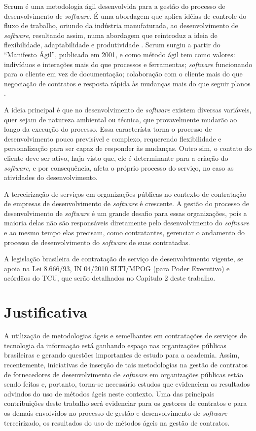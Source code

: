 Scrum é uma metodologia ágil desenvolvida para a gestão do processo de desenvolvimento de \textit{software}. É uma abordagem que aplica idéias de controle do fluxo de trabalho, oriundo da indústria manufaturada, ao desenvolvimento de \textit{software}, resultando assim, numa abordagem que reintroduz a ideia de flexibilidade, adaptabilidade e produtividade \cite{porto}. Scrum surgiu a partir do “Manifesto Ágil”, publicado em 2001, e como método ágil tem como valores: indivíduos e interações mais do que processos e ferramentas; \textit{software} funcionando para o cliente em vez de documentação; colaboração com o cliente mais do que negociação de contratos e resposta rápida às mudanças mais do que seguir planos \cite{manifesto}. 

A ideia principal é que no desenvolvimento de \textit{software} existem diversas variáveis, quer sejam de natureza ambiental ou técnica, que provavelmente mudarão ao longo da execução do processo. Essa característa torna o processo de desenvolvimento pouco previsível e complexo, requerendo flexibilidade e personalização para ser capaz de responder às mudanças. Outro sim, o contato do cliente deve ser ativo, haja visto que, ele é determinante para a criação do \textit{software}, e por consequência, afeta o próprio processo do serviço, no caso as atividades do desenvolvimento.

A terceirização de serviços em organizações públicas no contexto de contratação de empresas de desenvolvimento de \textit{software} é crescente. A gestão do processo de desenvolvimento de \textit{software} é um grande desafio para essas organizações, pois a maioria delas não são responsáveis diretamente pelo desenvolvimento do \textit{software} e ao mesmo tempo elas precisam, como contratantes, gerenciar o andamento do processo de desenvolvimento do \textit{software} de suas contratadas. 

A legislação brasileira de contratação de serviço de desenvolvimento vigente, se apoia na Lei 8.666/93, IN 04/2010 SLTI/MPOG (para Poder Executivo) e acórdãos do TCU, que serão detalhados no Capítulo 2 deste trabalho. 



\section[Justificativa]{Justificativa}

A utilização de metodologias ágeis e semelhantes em contratações de serviços de tecnologia da informação está ganhando espaço nas organizações públicas brasileiras e gerando questões importantes de estudo para a academia. Assim, recentemente, iniciativas de inserção de tais metodologias na gestão de contratos de fornecedores de desenvolvimento de \textit{software} em organizações públicas estão sendo feitas e, portanto, torna-se necessário estudos que evidenciem os resultados advindos do uso de métodos ágeis neste contexto. Uma das principais contribuições deste trabalho será evidenciar para os gestores de contratos e para os demais envolvidos no processo de gestão e desenvolvimento de \textit{software} terceirizado, os resultados do uso de métodos ágeis na gestão de contratos. 

